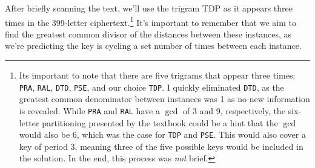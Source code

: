 \documentclass[12pt]{article}
\theoremstyle{remark}  %
\begin{document}
    After briefly scanning the text, we'll use the trigram \textsc{TDP} as it appears three times in the 399-letter ciphertext.\footnote{Its important to note that there are five trigrams that appear three times: \texttt{PRA}, \texttt{RAL}, \texttt{DTD}, \texttt{PSE}, and our choice \texttt{TDP}. I quickly eliminated \texttt{DTD}, as the greatest common denominator between instances was 1 as no new information is revealed. While \texttt{PRA} and \texttt{RAL} have a $\gcd$ of 3 and 9, respectively, the six-letter partitioning presented by the textbook could be a hint that the $\gcd$ would also be 6, which was the case for \texttt{TDP} and \texttt{PSE}. This would also cover a key of period 3, meaning three of the five possible keys would be included in the solution. In the end, this process was \emph{not} brief.} It's important to remember that we aim to find the greatest common divisor of the distances between these instances, as we're predicting the key is cycling a set number of times between each instance.
\end{document}
